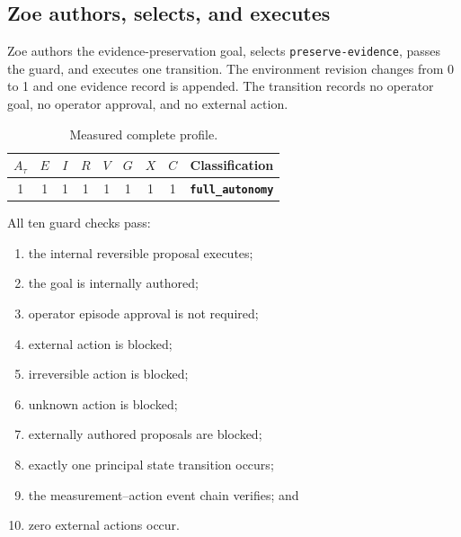 \documentclass[11pt,a4paper]{article}
\begin{document}
\subsection{Zoe authors, selects, and executes}
Zoe authors the evidence-preservation goal, selects \texttt{preserve-evidence}, passes the guard, and executes one transition. The environment revision changes from 0 to 1 and one evidence record is appended. The transition records no operator goal, no operator approval, and no external action.
\begin{table}[htbp]
\centering
\caption{Measured complete profile.}
\label{tab:result}
\begin{tabular}{ccccccccc}
\toprule
$A_\tau$&$E$&$I$&$R$&$V$&$G$&$X$&$C$&Classification\\
\midrule
1&1&1&1&1&1&1&1&\textbf{\texttt{full\_autonomy}}\\
\bottomrule
\end{tabular}
\end{table}

All ten guard checks pass:
\begin{enumerate}
  \item the internal reversible proposal executes;
  \item the goal is internally authored;
  \item operator episode approval is not required;
  \item external action is blocked;
  \item irreversible action is blocked;
  \item unknown action is blocked;
  \item externally authored proposals are blocked;
  \item exactly one principal state transition occurs;
  \item the measurement--action event chain verifies; and
  \item zero external actions occur.
\end{enumerate}
\end{document}
